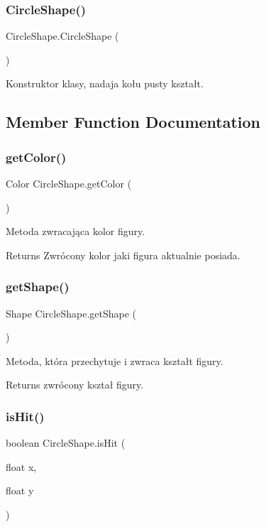 \subsubsection{Circle\+Shape()}
{\footnotesize\ttfamily Circle\+Shape.\+Circle\+Shape (\begin{DoxyParamCaption}{ }\end{DoxyParamCaption})}

Konstruktor klasy, nadaja kołu pusty kształt. 

\subsection{Member Function Documentation}
\mbox{\label{class_circle_shape_af3c09f8c923de5288fbf29b358edb83c}} 
\subsubsection{get\+Color()}
{\footnotesize\ttfamily Color Circle\+Shape.\+get\+Color (\begin{DoxyParamCaption}{ }\end{DoxyParamCaption})}

Metoda zwracająca kolor figury. \begin{DoxyReturn}{Returns}
Zwrócony kolor jaki figura aktualnie posiada. 
\end{DoxyReturn}
\mbox{\label{class_circle_shape_acf52c076e8572ec493865edf71d7ceee}} 
\subsubsection{get\+Shape()}
{\footnotesize\ttfamily Shape Circle\+Shape.\+get\+Shape (\begin{DoxyParamCaption}{ }\end{DoxyParamCaption})}

Metoda, która przechytuje i zwraca kształt figury. \begin{DoxyReturn}{Returns}
zwrócony kształ figury. 
\end{DoxyReturn}
\mbox{\label{class_circle_shape_ae7ab9718a4fa67def8410409e5d7934c}} 
\subsubsection{is\+Hit()}
{\footnotesize\ttfamily boolean Circle\+Shape.\+is\+Hit (\begin{DoxyParamCaption}\item[{float}]{x,  }\item[{float}]{y }\end{DoxyParamCaption})}

